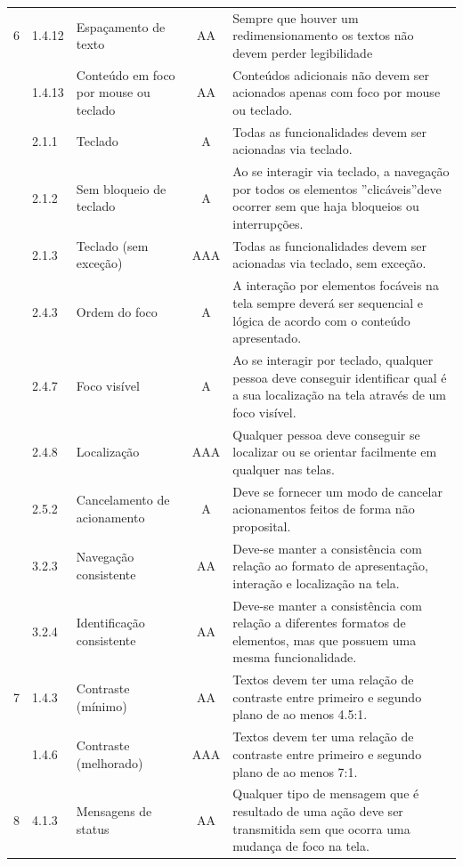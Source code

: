 {{\begin{minipage}{\linewidth}
{\begin{tabular}{|c|l|l|c|p{400px}|}
    \hline 
    6 & 1.4.12 & Espaçamento de texto & AA & Sempre que houver um redimensionamento os textos não devem perder legibilidade\\
        \cline{2-5} & 1.4.13 & Conteúdo em foco por mouse ou teclado & AA & Conteúdos adicionais não devem ser acionados apenas com foco por mouse ou teclado.\\
        \cline{2-5} & 2.1.1 & Teclado & A & Todas as funcionalidades devem ser acionadas via teclado. \\
        \cline{2-5} & 2.1.2 & Sem bloqueio de teclado & A & Ao se interagir via teclado, a navegação por todos os elementos ”clicáveis”deve ocorrer sem que haja bloqueios ou interrupções.\\
        \cline{2-5} & 2.1.3 & Teclado (sem exceção) & AAA & Todas as funcionalidades devem ser acionadas via teclado, sem exceção.\\
        \cline{2-5} & 2.4.3 & Ordem do foco & A & A interação por elementos focáveis na tela sempre deverá ser sequencial e lógica de acordo com o conteúdo apresentado.\\
        \cline{2-5} & 2.4.7 & Foco visível & A & Ao se interagir por teclado, qualquer pessoa deve conseguir identificar qual é a sua localização na tela através de um foco visível. \\
        \cline{2-5} & 2.4.8 & Localização & AAA & Qualquer pessoa deve conseguir se localizar ou se orientar facilmente em qualquer nas telas.\\
        \cline{2-5} & 2.5.2 & Cancelamento de acionamento & A & Deve se fornecer um modo de cancelar acionamentos feitos de forma não proposital.\\
        \cline{2-5} & 3.2.3 & Navegação consistente & AA & Deve-se manter a consistência com relação ao formato de apresentação, interação e localização na tela. \\
        \cline{2-5} & 3.2.4 & Identificação consistente & AA & Deve-se manter a consistência com relação a diferentes formatos de elementos, mas que possuem uma mesma funcionalidade.\\
    \hline
    7 & 1.4.3 & 
        Contraste (mínimo) & AA & Textos devem ter uma relação de contraste entre primeiro e segundo plano de ao menos 4.5:1.\\
        \cline{2-5} & 1.4.6 & Contraste (melhorado) & AAA & Textos devem ter uma relação de contraste entre primeiro e segundo plano de ao menos 7:1.\\
    \hline
    8 & 4.1.3 & 
        Mensagens de status & AA & Qualquer tipo de mensagem que é resultado de uma ação deve ser transmitida sem que ocorra uma mudança de foco na tela.\\
    \hline

\end{tabular}}
\label{elementos de UI}

\end{minipage}

}}


